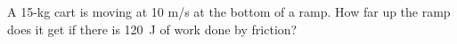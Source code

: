 \documentclass[10pt]{exam}
\begin{document}
\begin{questions}
  

\question
  A 15-kg cart is moving at 10 m/s at the bottom of a ramp.  How far up the ramp does it get if there is 120~J of work done by friction?
  \vs[2]






\end{questions}
\end{document}
